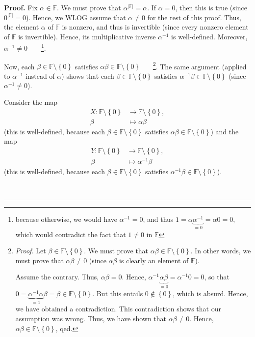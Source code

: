 \documentclass[numbers=enddot,12pt,final,onecolumn,notitlepage]{scrartcl}%
\theoremstyle{definition}
\newenvironment{proof}[1][Proof]{\noindent\textbf{#1.} }{\ \rule{0.5em}{0.5em}}
\begin{document}
\begin{proof}
Fix $\alpha\in\mathbb{F}$. We must prove that $\alpha^{\left\vert
\mathbb{F}\right\vert }=\alpha$. If $\alpha=0$, then this is true (since
$0^{\left\vert \mathbb{F}\right\vert }=0$). Hence, we WLOG assume that
$\alpha\neq0$ for the rest of this proof. Thus, the element $\alpha$ of
$\mathbb{F}$ is nonzero, and thus is invertible (since every nonzero element
of $\mathbb{F}$ is invertible). Hence, its multiplicative inverse $\alpha
^{-1}$ is well-defined. Moreover, $\alpha^{-1}\neq0$\ \ \ \ \footnote{because
otherwise, we would have $\alpha^{-1}=0$, and thus $1=\alpha\underbrace{\alpha
^{-1}}_{=0}=\alpha0=0$, which would contradict the fact that $1\neq0$ in
$\mathbb{F}$}.

Now, each $\beta\in\mathbb{F}\setminus\left\{  0\right\}  $ satisfies
$\alpha\beta\in\mathbb{F}\setminus\left\{  0\right\}  $%
\ \ \ \footnote{\textit{Proof.} Let $\beta\in\mathbb{F}\setminus\left\{
0\right\}  $. We must prove that $\alpha\beta\in\mathbb{F}\setminus\left\{
0\right\}  $. In other words, we must prove that $\alpha\beta\neq0$ (since
$\alpha\beta$ is clearly an element of $\mathbb{F}$).
\par
Assume the contrary. Thus, $\alpha\beta=0$. Hence, $\alpha^{-1}%
\underbrace{\alpha\beta}_{=0}=\alpha^{-1}0=0$, so that $0=\underbrace{\alpha
^{-1}\alpha}_{=1}\beta=\beta\in\mathbb{F}\setminus\left\{  0\right\}  $. But
this entails $0\notin\left\{  0\right\}  $, which is absurd. Hence, we have
obtained a contradiction. This contradiction shows that our assumption was
wrong. Thus, we have shown that $\alpha\beta\neq0$. Hence, $\alpha\beta
\in\mathbb{F}\setminus\left\{  0\right\}  $, qed.}. The same argument (applied
to $\alpha^{-1}$ instead of $\alpha$) shows that each $\beta\in\mathbb{F}%
\setminus\left\{  0\right\}  $ satisfies $\alpha^{-1}\beta\in\mathbb{F}%
\setminus\left\{  0\right\}  $ (since $\alpha^{-1}\neq0$).

Consider the map%
\begin{align*}
X:\mathbb{F}\setminus\left\{  0\right\}   &  \rightarrow\mathbb{F}%
\setminus\left\{  0\right\}  ,\\
\beta &  \mapsto\alpha\beta
\end{align*}
(this is well-defined, because each $\beta\in\mathbb{F}\setminus\left\{
0\right\}  $ satisfies $\alpha\beta\in\mathbb{F}\setminus\left\{  0\right\}
$) and the map%
\begin{align*}
Y:\mathbb{F}\setminus\left\{  0\right\}   &  \rightarrow\mathbb{F}%
\setminus\left\{  0\right\}  ,\\
\beta &  \mapsto\alpha^{-1}\beta
\end{align*}
(this is well-defined, because each $\beta\in\mathbb{F}\setminus\left\{
0\right\}  $ satisfies $\alpha^{-1}\beta\in\mathbb{F}\setminus\left\{
0\right\}  $).


\end{proof}
\end{document}
